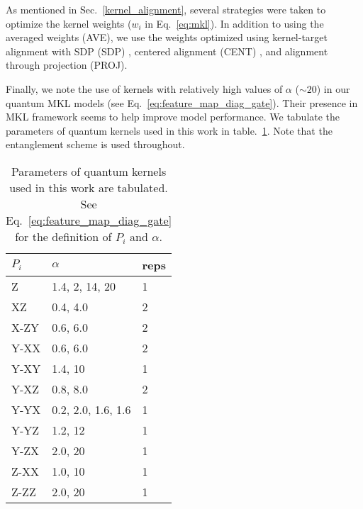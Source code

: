 \documentclass[reprint,amsfonts, amssymb, amsmath,  showkeys, nofootinbib,pra, superscriptaddress, twocolumn,longbibliography]{revtex4-2}
\begin{document}
As mentioned in Sec.~\ref{kernel_alignment}, several strategies were taken to optimize the kernel weights ($w_i$ in Eq.~\ref{eq:mkl}). In addition to using the averaged weights (AVE), we use the weights optimized using kernel-target alignment with SDP (SDP) \cite{JMLR:v5:Lanckriet}, centered alignment (CENT) \cite{JMLR:v13:cortes12a}, and alignment through projection (PROJ). 

Finally, we note the use of kernels with relatively high values of $\alpha$ ($\sim 20$) in our quantum MKL models (see Eq.~\ref{eq:feature_map_diag_gate}). Their presence in MKL framework seems to help improve model performance. We tabulate the parameters of quantum kernels used in this work in table.~\ref{Table:kernel_params}. Note that the  entanglement scheme is used throughout.
\begin{table}[!ht]
    \centering
    \begin{tabular}{|l|l|l|}
    \hline
        $P_i$ & $\alpha$ & reps \\ \hline
        Z & 1.4, 2, 14, 20 & 1 \\ \hline
        XZ & 0.4, 4.0  & 2 \\ \hline
        X-ZY & 0.6, 6.0 & 2 \\ \hline
        Y-XX & 0.6, 6.0 & 2 \\ \hline
        Y-XY & 1.4, 10 & 1 \\ \hline
        Y-XZ & 0.8, 8.0 & 2 \\ \hline
        Y-YX & 0.2, 2.0, 1.6, 1.6 & 1 \\ \hline
        Y-YZ & 1.2, 12 & 1 \\ \hline
        Y-ZX & 2.0, 20 & 1 \\ \hline
        Z-XX & 1.0, 10 & 1 \\ \hline
        Z-ZZ & 2.0, 20 & 1 \\ \hline
    \end{tabular}
    \caption{\label{Table:kernel_params}
    Parameters of quantum kernels used in this work are tabulated. See Eq.~\ref{eq:feature_map_diag_gate} for the definition of $P_i$ and $\alpha$.}
\end{table}
\end{document}
